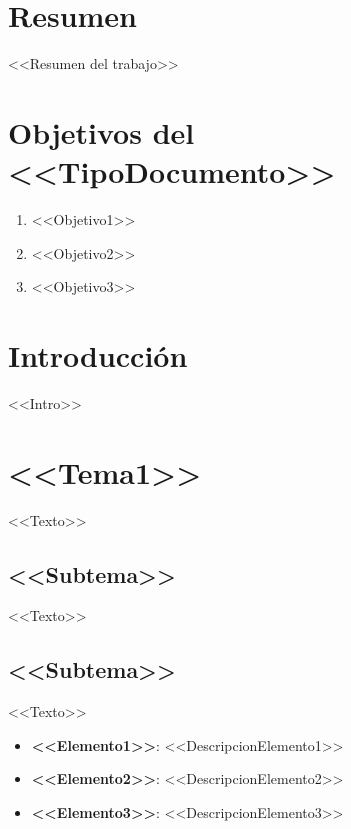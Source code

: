 \documentclass[12pt,letterpaper]{article}
\begin{document}
\setcounter{page}{1} %

\section*{Resumen}

<<Resumen del trabajo>>
\section*{Objetivos del <<TipoDocumento>>}

\begin{enumerate}
  \item <<Objetivo1>>
  \item <<Objetivo2>>
  \item <<Objetivo3>>
\end{enumerate}

\newpage

\tableofcontents
\newpage

\listoffigures
\newpage

\section{Introducción}

<<Intro>>

\newpage

\section{<<Tema1>>}

<<Texto>>

\subsection{<<Subtema>>}
<<Texto>>

\subsection{<<Subtema>>}

<<Texto>>

\begin{itemize}
  \item \textbf{<<Elemento1>>}: <<DescripcionElemento1>>
  \item \textbf{<<Elemento2>>}: <<DescripcionElemento2>>
  \item \textbf{<<Elemento3>>}: <<DescripcionElemento3>>
\end{itemize}
\end{document}
